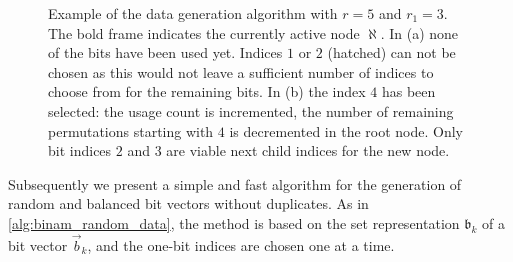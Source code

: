 \begin{figure}
	\centering
	\quad
	\caption[Balanced data generation algorithm example 1]{Example of the data generation algorithm with $r = 5$ and $r_1 = 3$. The bold frame indicates the currently active node $\aleph$. In (a) none of the bits have been used yet. Indices $1$ or $2$ (hatched) can not be chosen as this would not leave a sufficient number of indices to choose from for the remaining bits. In (b) the index $4$ has been selected: the usage count is incremented, the number of remaining permutations starting with $4$ is decremented in the root node. Only bit indices $2$ and $3$ are viable next child indices for the new node.}
	\label{fig:binam_balanced_data_generation_algo1}
\end{figure}
Subsequently we present a simple and fast algorithm for the generation of \nSamples random and balanced bit vectors without duplicates. As in \cref{alg:binam_random_data}, the method is based on the set representation $\mathfrak{b}_k$ of a bit vector $\vec b_k$, and the one-bit indices are chosen one at a time.

